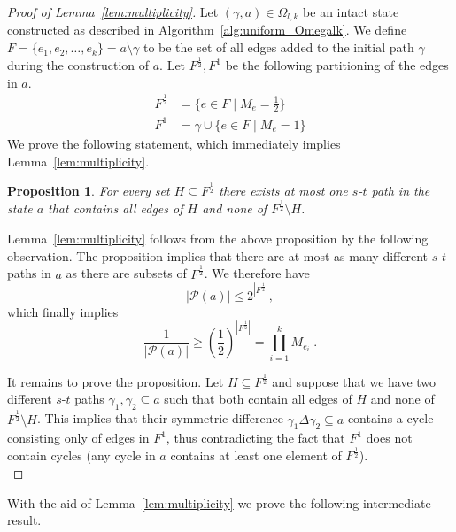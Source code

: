 \documentclass{article}
\newtheorem*{proposition*}{Proposition}
\begin{document}
\begin{proof}[Proof of Lemma~\ref{lem:multiplicity}]
Let $(\gamma,a)\in \Omega_{l,k}$ be an intact state
constructed as described in
Algorithm~\ref{alg:uniform_Omegalk}. We define
$F=\{e_1,e_2,\dots,e_k\}=a\setminus\gamma$ to be the set of
all edges added to the initial path $\gamma$ during the
construction of $a$. Let $F^{\frac{1}{2}},F^{1}$ be
the following partitioning of the edges in $a$.
\begin{align*}
F^{\frac{1}{2}}&=\{e\in F \mid M_{e}=\frac{1}{2}\}\\
F^1&=\gamma \cup \{e\in F \mid M_{e}=1\}
\end{align*}
We prove the following statement, which immediately
implies Lemma~\ref{lem:multiplicity}.

\begin{proposition*}
For every set $H\subseteq F^{\frac{1}{2}}$ there exists at
most one $s$-$t$ path in the state $a$ that contains all
edges of $H$ and none of $F^\frac{1}{2}\setminus H$.
\end{proposition*}

Lemma~\ref{lem:multiplicity} follows from the above
proposition by the following observation. The proposition
implies that there are at most as many different $s$-$t$
paths in $a$ as there are subsets of $F^{\frac{1}{2}}$. We
therefore have
\begin{equation*}
|\mathcal{P}(a)|\leq 2^{\left|F^{\frac{1}{2}}\right|},
\end{equation*}
which finally implies
\begin{equation*}
\frac{1}{|\mathcal{P}(a)|}\geq \left(\frac{1}{2}\right)^{\left|F^{\frac{1}{2}}\right|}=\prod_{i=1}^k M_{e_i}\;.
\end{equation*}

It remains to prove the proposition. Let $H\subseteq
F^{\frac{1}{2}}$ and suppose that we have two different
$s$-$t$ paths $\gamma_1,\gamma_2\subseteq a$ such that both
contain all edges of $H$ and none of
$F^{\frac{1}{2}}\setminus H$. This implies that their
symmetric difference $\gamma_1 \Delta \gamma_2\subseteq a$
contains a cycle consisting only of edges in $F^1$, thus
contradicting the fact that $F^1$ does not contain cycles
(any cycle in $a$ contains at least one element of $F^{\frac{1}{2}}$).\\
\end{proof}

With the aid of Lemma~\ref{lem:multiplicity} we prove
the following intermediate result.
\end{document}
